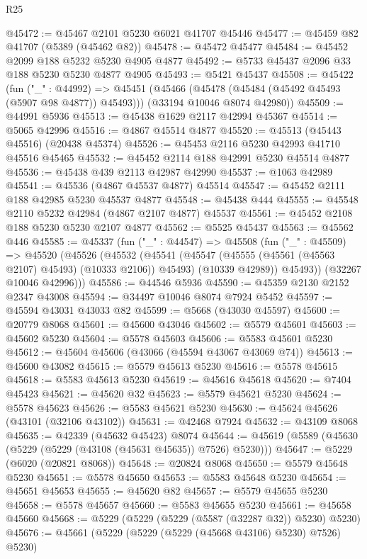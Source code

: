 \begin{lexlean}{R25}
\begin{coremodule}
@45472 := @45467 @2101 @5230 @6021 @41707 @45446
@45477 := @45459 @82 @41707 (@5389 (@45462 @82))
@45478 := @45472 @45477
@45484 := @45452 @2099 @188 @5232 @5230 @4905 @4877
@45492 := @5733 @45437 @2096 @33 @188 @5230 @5230 @4877 @4905
@45493 := @5421 @45437
@45508 := @45422
    (fun ("_" : @44992) =>
    @45451
      (@45466 (@45478 (@45484 (@45492 @45493 (@5907 @98 @4877)) @45493)))
      (@33194 @10046 @8074 @42980))
@45509 := @44991 @5936
@45513 := @45438 @1629 @2117 @42994 @45367
@45514 := @5065 @42996
@45516 := @4867 @45514 @4877
@45520 := @45513 (@45443 @45516) (@20438 @45374)
@45526 := @45453 @2116 @5230 @42993 @41710 @45516 @45465
@45532 := @45452 @2114 @188 @42991 @5230 @45514 @4877
@45536 := @45438 @439 @2113 @42987 @42990
@45537 := @1063 @42989
@45541 := @45536 (@4867 @45537 @4877) @45514
@45547 := @45452 @2111 @188 @42985 @5230 @45537 @4877
@45548 := @45438 @444
@45555 := @45548 @2110 @5232 @42984 (@4867 @2107 @4877) @45537
@45561 := @45452 @2108 @188 @5230 @5230 @2107 @4877
@45562 := @5525 @45437
@45563 := @45562 @446
@45585 := @45337
    (fun ("_" : @44547) =>
    @45508
      (fun ("_" : @45509) =>
      @45520
        (@45526
          (@45532
            (@45541
              (@45547 (@45555 (@45561 (@45563 @2107) @45493) (@10333 @2106)) @45493)
              (@10339 @42989))
            @45493))
        (@32267 @10046 @42996)))
@45586 := @44546 @5936
@45590 := @45359 @2130 @2152 @2347 @43008
@45594 := @34497 @10046 @8074 @7924 @5452
@45597 := @45594 @43031 @43033 @82
@45599 := @5668 (@43030 @45597)
@45600 := @20779 @8068
@45601 := @45600 @43046
@45602 := @5579 @45601
@45603 := @45602 @5230
@45604 := @5578 @45603
@45606 := @5583 @45601 @5230
@45612 := @45604 @45606 (@43066 (@45594 @43067 @43069 @74))
@45613 := @45600 @43082
@45615 := @5579 @45613 @5230
@45616 := @5578 @45615
@45618 := @5583 @45613 @5230
@45619 := @45616 @45618
@45620 := @7404 @45423
@45621 := @45620 @32
@45623 := @5579 @45621 @5230
@45624 := @5578 @45623
@45626 := @5583 @45621 @5230
@45630 := @45624 @45626 (@43101 (@32106 @43102))
@45631 := @42468 @7924
@45632 := @43109 @8068
@45635 := @42339 (@45632 @45423) @8074
@45644 := @45619 (@5589 (@45630 (@5229 (@5229 (@43108 (@45631 @45635)) @7526) @5230)))
@45647 := @5229 (@6020 (@20821 @8068))
@45648 := @20824 @8068
@45650 := @5579 @45648 @5230
@45651 := @5578 @45650
@45653 := @5583 @45648 @5230
@45654 := @45651 @45653
@45655 := @45620 @82
@45657 := @5579 @45655 @5230
@45658 := @5578 @45657
@45660 := @5583 @45655 @5230
@45661 := @45658 @45660
@45668 := @5229 (@5229 (@5229 (@5587 (@32287 @32)) @5230) @5230)
@45676 := @45661 (@5229 (@5229 (@5229 (@45668 @43106) @5230) @7526) @5230)

\end{coremodule}
\end{lexlean}
